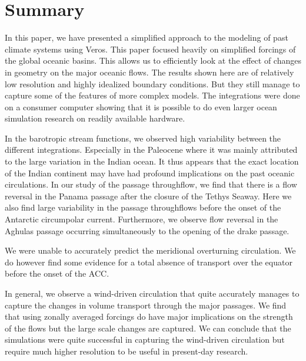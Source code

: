 \section{Summary}
In this paper, we have presented a simplified approach to the modeling of past climate systems using Veros. This paper focused heavily on simplified forcings of the global oceanic basins. This allows us to efficiently look at the effect of changes in geometry on the major oceanic flows. The results shown here are of relatively low resolution and highly idealized boundary conditions. But they still manage to capture some of the features of more complex models. The integrations were done on a consumer computer showing that it is possible to do even larger ocean simulation research on readily available hardware.

In the barotropic stream functions, we observed high variability between the different integrations. Especially in the Paleocene where it was mainly attributed to the large variation in the Indian ocean. It thus appears that the exact location of the Indian continent may have had profound implications on the past oceanic circulations. In our study of the passage throughflow, we find that there is a flow reversal in the Panama passage after the closure of the Tethys Seaway. Here we also find large variability in the passage throughflows before the onset of the Antarctic circumpolar current. Furthermore, we observe flow reversal in the Aghulas passage occurring simultaneously to the opening of the drake passage. 

We were unable to accurately predict the meridional overturning circulation. We do however find some evidence for a total absence of transport over the equator before the onset of the ACC.

In general, we observe a wind-driven circulation that quite accurately manages to capture the changes in volume transport through the major passages. We find that using zonally averaged forcings do have major implications on the strength of the flows but the large scale changes are captured. We can conclude that the simulations were quite successful in capturing the wind-driven circulation but require much higher resolution to be useful in present-day research.
